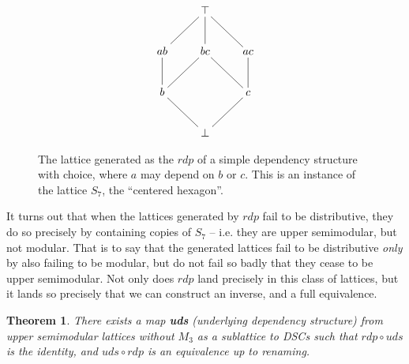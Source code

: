 \documentclass[hoptionsi,review,screen,format=acmsmall]{acmart}
\newtheorem{theorem}{Theorem}[section]
\theoremstyle{definition}
\begin{document}
\begin{figure}
\begin{minipage}[c]{0.3\textwidth}
\begin{equation*}
    \xymatrix{& \top \ar@{-}[dl] \ar@{-}[d] \ar@{-}[dr] & \\
      ab \ar@{-}[d]& bc \ar@{-}[dl] \ar@{-}[dr] &
        ac \ar@{-}[d]  \\
        b \ar@{-}[dr]  & & c \ar@{-}[dl] \\
        & \bot &
        } 
\end{equation*}
\end{minipage}
\caption{The lattice generated as the \(rdp\) of a simple dependency structure with choice, where \(a\) may depend on \(b\) or \(c\). This is an instance of the lattice \(S_7\), the ``centered hexagon''.}
\label{Fig3}
\end{figure}

It turns out that when the lattices generated by \(rdp\) fail to be distributive, they do so precisely by containing copies of \(S_7\) -- i.e. they are upper semimodular, but not modular. That is to say that the generated lattices fail to be distributive \textit{only} by also failing to be modular, but do not fail so badly that they cease to be upper semimodular. Not only does \(rdp\) land precisely in this class of lattices, but it lands so precisely that we can construct an inverse, and a full equivalence.

\begin{theorem}
\label{representation}
There exists a map \textbf{uds} (underlying dependency structure) from upper semimodular lattices without \(M_3\) as a sublattice to DSCs such that  \(rdp \circ uds\) is the identity, and \(uds \circ rdp\) is an equivalence up to renaming.
\end{theorem}
\end{document}
